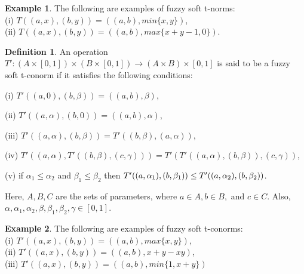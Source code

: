 \documentclass{article}
\theoremstyle{definition}
\newtheorem{definition}{Definition}[section]
\newtheorem{example}{Example}[section]
\begin{document}
\begin{example}
     The following are examples of fuzzy soft t-norms:\\
    (i) $T((a, x), (b, y))=((a, b), min\{x, y\})$, \\
    (ii) $T((a, x), (b, y))=((a, b), max\{x+y-1, 0\})$.\\
\end{example}


\begin{definition}
     An operation $T':(A\times[0, 1])\times (B\times[0, 1]) \to (A\times B)\times[0, 1]$ is said to be a fuzzy soft t-conorm if it satisfies the following conditions: 

    (i) $T'((a, 0), (b, \beta))=((a, b), \beta)$,

    (ii) $T'((a, \alpha), (b, 0))=((a, b), \alpha)$,
     
    (iii) $T'((a, \alpha), (b, \beta))=T'((b, \beta), (a, \alpha))$,

    (iv) $T'((a, \alpha), T'((b, \beta), (c, \gamma)))=T'(T'((a, \alpha), (b, \beta)), (c, \gamma))$,

    (v) if $\alpha_1 \leq \alpha_2$ and $\beta_1\leq \beta_2$ then $T'((a, \alpha_1), (b, \beta_1))\\ \leq T'((a, \alpha_2), (b, \beta_2))$.

 Here, $A, B, C$ are the sets of parameters, where $a\in A, b\in B,$  and $ c\in C$. Also, $\alpha, \alpha_1, \alpha_2, \beta, \beta_1, \beta_2, \gamma \in [0, 1]$.\\

\end{definition}

\begin{example} The following are examples of fuzzy soft t-conorms:\\ (i) $T'((a, x), (b, y))=((a, b), max\{x, y\})$,\\  
(ii) $T'((a, x), (b, y))=((a, b), x+y-xy)$,\\ 
(iii) $T'((a, x), (b, y))=((a, b), min\{1, x+y\})$ 
\end{example}
\end{document}
